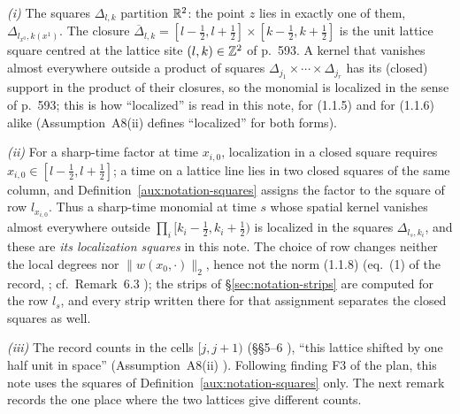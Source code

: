 \begin{auxrem}\label{aux:notation-gjslattice}
\emph{(i)} The squares $\Delta_{l,k}$ partition $\mathbb{R}^2$: the point $z$ lies in exactly one of
them, $\Delta_{l_{x^0},k(x^1)}$.  The closure
$\overline{\Delta}_{l,k}=[l-\frac12,l+\frac12]\times[k-\frac12,k+\frac12]$ is the unit
lattice square centred at the lattice site $(l,k)\in\mathbb{Z}^2$ of p.~593.  A kernel that vanishes
almost everywhere outside a product of squares $\Delta_{j_1}\times\cdots\times\Delta_{j_r}$
has its (closed) support in the product of their closures, so the monomial is localized in
the sense of p.~593; this is how ``localized'' is read in this note, for (1.1.5) and for
(1.1.6) alike (Assumption~A8(ii) \cite[p.~10]{R} defines ``localized'' for both forms).

\emph{(ii)} For a sharp-time factor at time $x_{i,0}$, localization in a closed square
requires $x_{i,0}\in[l-\frac12,l+\frac12]$; a time on a lattice line lies in two closed
squares of the same column, and Definition~\ref{aux:notation-squares} assigns the factor to
the square of row $l_{x_{i,0}}$.  Thus a sharp-time monomial at time $s$ whose spatial
kernel vanishes almost everywhere outside $\prod_i[k_i-\frac12,k_i+\frac12)$ is localized in
the squares $\Delta_{l_s,k_i}$, and these are \emph{its localization squares} in this note.
The choice of row changes neither the local degrees nor $\|w(x_0,\cdot)\|_2$, hence not the
norm (1.1.8) (eq.~(1) of the record, \cite[p.~10]{R}; cf.\ Remark~6.3 \cite[p.~20]{R}); the
strips of \S\ref{sec:notation-strips} are computed for the row $l_s$, and every strip
written there for that assignment separates the closed squares as well.

\emph{(iii)} The record counts in the cells $[j,j+1)$ (\S\S5--6 \cite[pp.~18--20]{R}),
``this lattice shifted by one half unit in space'' (Assumption~A8(ii) \cite[p.~10]{R}).
Following finding F3 of the plan, this note uses the squares of
Definition~\ref{aux:notation-squares} only.  The next remark records the one place where
the two lattices give different counts.


\end{auxrem}
